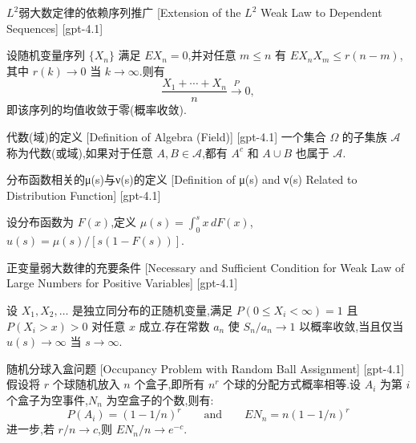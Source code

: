 \documentclass[UTF8]{ctexart}
\begin{document}
    
    
    \begin{thm}
        {$L^{2}$弱大数定律的依赖序列推广}
        [Extension of the $L^{2}$ Weak Law to Dependent Sequences]
        [gpt-4.1]
        
设随机变量序列 $\{X_n\}$ 满足 $E X_{n} = 0$,并对任意 $m \leq n$ 有 $E X_{n} X_{m} \leq r(n-m)$,其中 $r(k) \to 0$ 当 $k \to \infty$.则有
\[
\frac{X_{1} + \cdots + X_{n}}{n} \xrightarrow{P} 0,
\]
即该序列的均值收敛于零(概率收敛).

    \end{thm}
    
    
    
    \begin{dfn}
        {代数(域)的定义}
        [Definition of Algebra (Field)]
        [gpt-4.1]
        一个集合 $\Omega$ 的子集族 $\mathcal{A}$ 称为代数(或域),如果对于任意 $A, B \in \mathcal{A}$,都有 $A^c$ 和 $A \cup B$ 也属于 $\mathcal{A}$.
    \end{dfn}
    
    
    
    \begin{dfn}
        {分布函数相关的μ(s)与ν(s)的定义}
        [Definition of μ(s) and ν(s) Related to Distribution Function]
        [gpt-4.1]
        
设分布函数为 $F(x)$,定义
$\mu(s) = \int_{0}^{s} x\,dF(x)$,
$
u(s) = \mu(s) / [s (1 - F(s))]$.

    \end{dfn}
    
    
    
    \begin{thm}
        {正变量弱大数律的充要条件}
        [Necessary and Sufficient Condition for Weak Law of Large Numbers for Positive Variables]
        [gpt-4.1]
        
设 $X_{1}, X_{2}, \dots$ 是独立同分布的正随机变量,满足 $P(0 \leq X_{i} < \infty) = 1$ 且 $P(X_{i} > x) > 0$ 对任意 $x$ 成立.存在常数 $a_{n}$ 使 $S_{n}/a_{n} \to 1$ 以概率收敛,当且仅当 $
u(s) \to \infty$ 当 $s \to \infty$.

    \end{thm}
    
    
    
    \begin{xmp}
        {随机分球入盒问题}
        [Occupancy Problem with Random Ball Assignment]
        [gpt-4.1]
        假设将 $r$ 个球随机放入 $n$ 个盒子,即所有 $n^r$ 个球的分配方式概率相等.设 $A_i$ 为第 $i$ 个盒子为空事件,$N_n$ 为空盒子的个数,则有:
\[
P(A_i) = (1 - 1/n)^r \qquad \mathrm{and} \qquad E N_n = n (1 - 1/n)^r
\]
进一步,若 $r/n \to c$,则 $E N_n / n \to e^{-c}$.

    \end{xmp}
    
\end{document}
